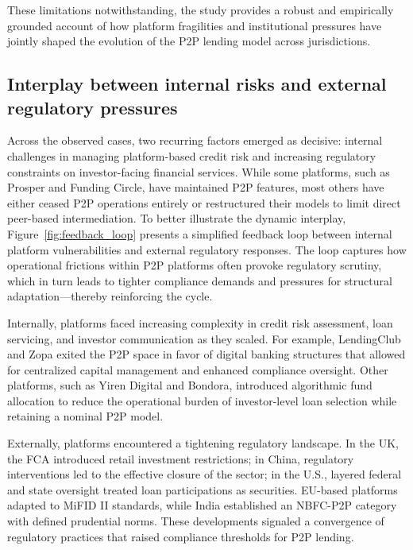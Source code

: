 \documentclass[pdflatex,sn-apa]{sn-jnl}%
\theoremstyle{thmstyleone}%
\theoremstyle{thmstyletwo}%
\theoremstyle{thmstylethree}%
\begin{document}
\textcolor{NavyBlue}{
These limitations notwithstanding, the study provides a robust and empirically grounded account of how platform fragilities and institutional pressures have jointly shaped the evolution of the P2P lending model across jurisdictions.}


\subsection{Interplay between internal risks and external regulatory pressures}
Across the observed cases, two recurring factors emerged as decisive: internal challenges in managing platform-based credit risk and increasing regulatory constraints on investor-facing financial services. While some platforms, such as Prosper and Funding Circle, have maintained P2P features, most others have either ceased P2P operations entirely or restructured their models to limit direct peer-based intermediation. \textcolor{NavyBlue}{
To better illustrate the dynamic interplay, Figure~\ref{fig:feedback_loop} presents a simplified feedback loop between internal platform vulnerabilities and external regulatory responses. The loop captures how operational frictions within P2P platforms often provoke regulatory scrutiny, which in turn leads to tighter compliance demands and pressures for structural adaptation—thereby reinforcing the cycle.
}

Internally, platforms faced increasing complexity in credit risk assessment, loan servicing, and investor communication as they scaled. For example, LendingClub and Zopa exited the P2P space in favor of digital banking structures that allowed for centralized capital management and enhanced compliance oversight. Other platforms, such as Yiren Digital and Bondora, introduced algorithmic fund allocation to reduce the operational burden of investor-level loan selection while retaining a nominal P2P model.

Externally, platforms encountered a tightening regulatory landscape. In the UK, the FCA introduced retail investment restrictions; in China, regulatory interventions led to the effective closure of the sector; in the U.S., layered federal and state oversight treated loan participations as securities. EU-based platforms adapted to MiFID II standards, while India established an NBFC-P2P category with defined prudential norms. These developments signaled a convergence of regulatory practices that raised compliance thresholds for P2P lending.
\end{document}
